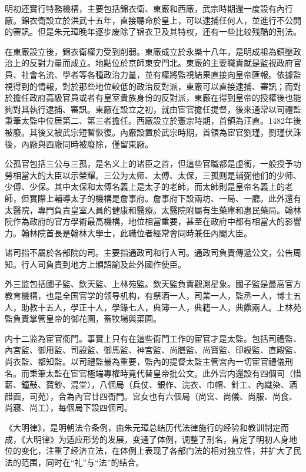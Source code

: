 明初还實行特務機構，主要包括錦衣衛、東廠和西廠，武宗時期還一度設有內行廠。錦衣衛設立於洪武十五年，直接聽命於皇上，可以逮捕任何人，並進行不公開的審訊。但是朱元璋晚年逐步废除了锦衣卫及其特权，还有一些比较残酷的刑法。

在東廠設立後，錦衣衛權力受到削弱。東廠成立於永樂十八年，是明成祖為鎮壓政治上的反對力量而成立。地點位於京師東安門北。東廠的主要職責就是監視政府官員、社會名流、學者等各種政治力量，並有權將監視結果直接向皇帝匯報。依據監視得到的情報，對於那些地位較低的政治反對派，東廠可以直接逮捕、審訊；而對於擔任政府高級官員或者有皇室貴族身份的反對派，東廠在得到皇帝的授權後也能夠對其執行逮捕、審訊。東廠在設立之初，就由宦官擔任提督，後來通常以司禮監秉筆太監中位居第二、第三者擔任。西廠設立於憲宗時期，首領為汪直。1482年後被廢。其後又被武宗短暫恢復。內廠設置於武宗時期，首領為宦官劉瑾，劉瑾伏誅後，內廠與西廠同時被廢除，僅留東廠。

公孤官包括三公与三孤，是名义上的诸臣之首，但這些官職都是虛銜，一般授予功勞相當大的大臣以示榮耀。三公为太师、太傅、太保，三孤则是辅弼他们的少师、少傅、少保。其中太保和太傅名義上是太子的老師，而太師則是皇帝名義上的老師，但實際上輔導太子的機構是詹事府。詹事府下設兩坊、一局、一廳。此外還有太醫院，專門負責皇室人員的健康和醫療。太醫院附屬有生藥庫和惠民藥局。翰林院作為政府的官方學術最高機構，地位相當重要，甚至在政府中都有相當大的影響力。翰林院首長是翰林大學士，此職位者經常會同時兼任內閣大臣。

诸司指不屬於各部院的司。主要指通政司和行人司。通政司負責傳遞公文，公告周知。行人司負責到地方上頒詔諭及赴外國作使臣。

外三监包括國子監、欽天監、上林苑監。欽天監負責觀測星象。國子監是最高官方教育機構，也是全国官学的领导机构，有祭酒一人，司業一人，監丞一人，博士五人，助教十五人，學正十人，學錄七人，典簿一人，典籍一人，典饌兩人。上林苑監負責掌管皇帝的御花園，畜牧場與菜圃。

内十二监為宦官衙門。事實上只有在這些衙門工作的宦官才是太監。包括司禮監、內宮監、御用監、司設監、御馬監、神宮監、尚膳監、尚寶監、印綬監、直殿監、尚衣監、都知監。以司禮監最為重要，監內的提督太監主管宮內一切宦官禮儀刑名。而秉筆太監在宦官極端專權時竟代替皇帝批公文。此外宫内還設有四個司（惜薪、鐘鼓、寶鈔、混堂），八個局（兵仗、銀作、浣衣、巾帽、針工、內織染、酒醋面，司苑），合為內官廿四衙門。宮女也有六個局（尚宮、尚儀、尚服、尚食、尚寢、尚工），每個局下設四個司。

《大明律》，是明朝法令条例，由朱元璋总结历代法律施行的经验和教训制定而成，《大明律》为适应形势的发展，变通了体例，调整了刑名，肯定了明初人身地位的变化，注重了经济立法，在体例上表现了各部门法的相对独立性，并扩大了民法的范围，同时在“礼”与“法”的结合。

